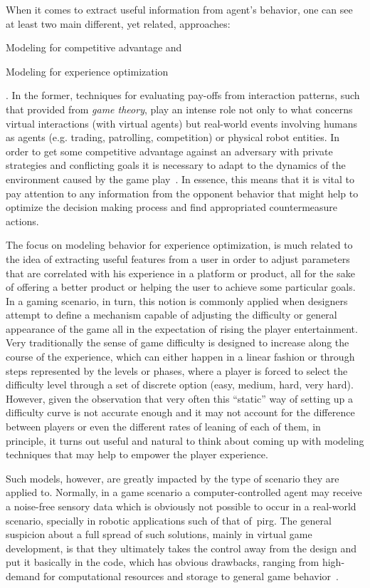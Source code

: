 When it comes to extract useful information from agent's behavior, one can see at least two main different, yet related, approaches: \begin{inparaenum}\item Modeling for competitive advantage and \item Modeling for experience optimization\end{inparaenum}. In the former, techniques for evaluating pay-offs from interaction patterns, such that provided from \textit{game theory}, play an intense role not only to what concerns virtual interactions (with virtual agents) but real-world events involving humans as agents (e.g. trading, patrolling, competition) or physical robot entities. In order to get some competitive advantage against an adversary with private strategies and conflicting goals it is necessary to adapt to the dynamics of the environment caused by the game play~\cite{rofer_overview_2012}. In essence, this means that it is vital to pay attention to any information from the opponent behavior that might help to optimize the decision making process and find appropriated countermeasure actions.

The focus on modeling behavior for experience optimization, is much related to the idea of extracting useful features from a user in order to adjust parameters that are correlated with his experience in a platform or product, all for the sake of offering a better product or helping the user to achieve some particular goals. In a gaming scenario, in turn, this notion is commonly applied when designers attempt to define a mechanism capable of adjusting the difficulty or general appearance of the game all in the expectation of rising the player entertainment. Very traditionally the sense of game difficulty is designed to increase along the course of the experience, which can either happen in a linear fashion or through steps represented by the levels or phases, where a player is forced to select the difficulty level through a set of discrete option (easy, medium, hard, very hard). However, given the observation that very often this ``static'' way of setting up a difficulty curve is not accurate enough and it may not account for the difference between players or even the different rates of leaning of each of them, in principle, it turns out useful and natural to think about coming up with modeling techniques that may help to empower the player experience. 

Such models, however, are greatly impacted by the type of scenario they are applied to. Normally, in a game scenario a computer-controlled agent may receive a noise-free sensory data which is obviously not possible to occur in a real-world scenario, specially in robotic applications such of that of~\gls{pirg}. The general suspicion about a full spread of such solutions, mainly in virtual game development, is that they ultimately takes the control away from the design and put it basically in the code, which has obvious drawbacks, ranging from high-demand for computational resources and storage to general game behavior~\cite{hunicke_ai_2004}. 

